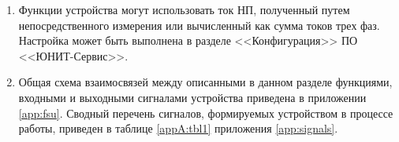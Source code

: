 \begin{enumerate}[label=\arabic{section}.\arabic{subsection}.\arabic*, labelsep=4pt, leftmargin=0pt, itemindent=57pt]
\begin{itemize}
    \item время возврата ИО напряжения при сбросе напряжения скачком от 2Uуст до 0 должно быть не более 40 мс; 
    \item погрешность выдержки времени -- не более 40 мс при выдержках менее 1,5 с и не более 2\% от уставки при выдержках времени выше 1,5 с;
    \item погрешность выдержки времени зависимой времятоковой характеристики не более 40 мс при уставке меньше 0,6 с, не более 12,5\% при 1,1≤I/Iср<5, не более 7,5\% при 5≤I/Iср<10 и не более 5\% при I/Iср≥10.
\end{itemize}
Специфические требования к характеристикам функциональных блоков приведены в описаниях соответствующих функций в данном разделе.
\item
Функции устройства могут использовать ток НП, полученный путем непосредственного измерения или вычисленный как сумма токов трех фаз. Настройка может быть выполнена в разделе <<Конфигурация>> ПО <<ЮНИТ-Сервис>>.
\item
Общая схема взаимосвязей между описанными в данном разделе функциями, входными и выходными сигналами устройства приведена в приложении \ref{app:fsu}.
Сводный перечень сигналов, формируемых устройством в процессе работы, приведен в таблице \ref{appA:tbl1} приложения \ref{app:signals}.

\end{enumerate}